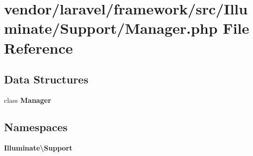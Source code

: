 \section{vendor/laravel/framework/src/\+Illuminate/\+Support/\+Manager.php File Reference}
\label{_support_2_manager_8php}
\subsection*{Data Structures}
\begin{DoxyCompactItemize}
\item 
class {\bf Manager}
\end{DoxyCompactItemize}
\subsection*{Namespaces}
\begin{DoxyCompactItemize}
\item 
 {\bf Illuminate\textbackslash{}\+Support}
\end{DoxyCompactItemize}

